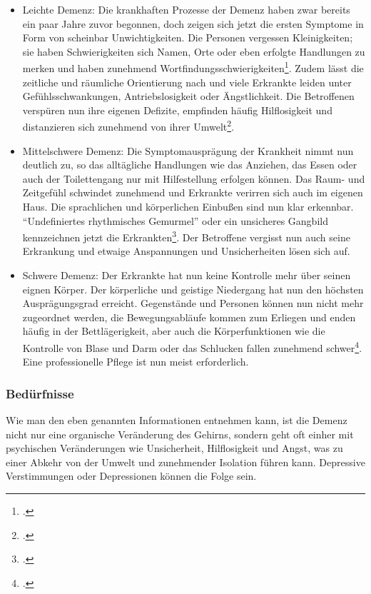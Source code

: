 \begin{itemize}
\item Leichte Demenz: Die krankhaften Prozesse der Demenz haben zwar bereits ein paar Jahre zuvor begonnen, doch zeigen sich jetzt die ersten Symptome in Form von scheinbar Unwichtigkeiten. Die Personen vergessen Kleinigkeiten; sie haben Schwierigkeiten sich Namen, Orte oder eben erfolgte Handlungen zu merken und haben zunehmend Wortfindungsschwierigkeiten\footcite[15]{Giruc2011}. Zudem lässt die zeitliche und räumliche Orientierung nach und viele Erkrankte leiden unter Gefühlsschwankungen, Antriebslosigkeit oder Ängstlichkeit. Die Betroffenen verspüren nun ihre eigenen Defizite, empfinden häufig Hilflosigkeit und distanzieren sich zunehmend von ihrer Umwelt\footcite[15f]{Giruc2011}.

\item Mittelschwere Demenz: Die Symptomausprägung der Krankheit nimmt nun deutlich zu, so das alltägliche Handlungen wie das Anziehen, das Essen oder auch der Toilettengang nur mit Hilfestellung erfolgen können. Das Raum- und Zeitgefühl schwindet zunehmend und Erkrankte verirren sich auch im eigenen Haus. Die sprachlichen und körperlichen Einbußen sind nun klar erkennbar. "`Undefiniertes rhythmisches Gemurmel"' oder ein unsicheres Gangbild kennzeichnen jetzt die Erkrankten\footcite[16f]{Giruc2011}. Der Betroffene vergisst nun auch seine Erkrankung und etwaige Anspannungen und Unsicherheiten lösen sich auf.

\item Schwere Demenz: Der Erkrankte hat nun keine Kontrolle mehr über seinen eignen Körper. Der körperliche und geistige Niedergang  hat nun den höchsten Ausprägungsgrad erreicht. Gegenstände und Personen können nun nicht mehr zugeordnet werden, die Bewegungsabläufe kommen zum Erliegen und enden häufig in der Bettlägerigkeit, aber auch die Körperfunktionen wie die Kontrolle von Blase und Darm oder das Schlucken fallen zunehmend schwer\footcite[17]{Giruc2011}. Eine professionelle Pflege ist nun meist erforderlich.
\end{itemize}

\subsubsection{Bedürfnisse }
\label{sec:k2.2.3_Beduerfnisse}

Wie man den eben genannten Informationen entnehmen kann, ist die Demenz nicht nur eine organische Veränderung des Gehirns, sondern geht oft einher mit psychischen Veränderungen wie Unsicherheit, Hilflosigkeit und Angst, was zu einer Abkehr von der Umwelt und zunehmender Isolation führen kann. Depressive Verstimmungen oder Depressionen können die Folge sein. 
 
